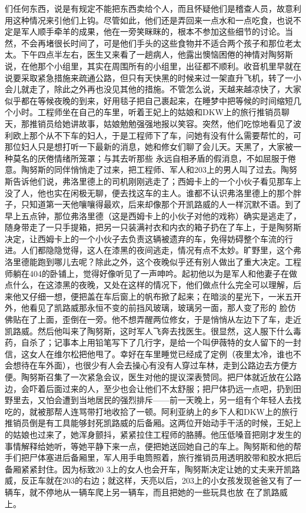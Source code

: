 \documentclass{article}
\begin{document}
们任何东西，说是有规定不能把东西卖给个人，而且怀疑他们是稽查人员，故意利用这种情况来引他们上钩。尽管如此，他们还是弄回来一点水和一点吃食，也说不定是军人顺手牵羊的成果，他在一旁笑眯眯的，根本不参加这些细节的讨论。当然，不会再堵很长时间了，可是他们手头的这些食物并不适合两个孩子和那位老太太。下午四点半左右，医生又来看了一趟病人，他露出懊恼困倦的神情对陶努斯说，在他那个小组里，其实在周围所有的小组里，出征都不顺利。收音机里早就在说要采取紧急措施来疏通公路，但只有天快黑的时候来过一架直升飞机，转了一小会儿就走了，除此之外再也没见其他的措施。不管怎么说，天越来越凉快了，大家似乎都在等候夜晚的到来，好用毯子把自己裹起来，在睡梦中把等候的时间缩短几个小时。工程师坐在自己的车里，听着王妃上的姑娘和DKW上的旅行推销员聊天，那推销员给她讲故事，姑娘勉勉强强地报以笑容。突然，他们吃惊地看见了波利欧上那个从不下车的妇人，于是工程师下了车，问她有没有什么需要帮忙的，可那位妇人只是想打听一下最新的消息，她和修女们聊了会儿天。天黑了，大家被一种莫名的厌倦情绪所笼罩；与其去听那些
\newpage
永远自相矛盾的假消息，不如屈服于倦意。陶努斯的同伴悄悄走了过来，把工程师、军人和203上的男人叫了过去。陶努斯告诉他们说，弗洛里德上的司机刚刚逃走了；西姆卡上的一个小伙子看见那车上没了人，他也实在闲极无聊，便去找这车的主人。谁都不认识弗洛里德上的那个胖子，只知道第一天他嚷嚷得最欢，后来却像那个开凯路威的人一样沉默不语。到了早上五点钟，那位弗洛里德（这是西姆卡上的小伙子对他的戏称）确实是逃走了，随身带走了一只手提箱，把另一只装满衬衣和内衣的箱子扔在了车上，于是陶努斯决定，让西姆卡上的一个小伙子去负责这辆被遗弃的车，免得妨碍整个车流的行进。人们都隐隐觉得，这人在漆黑的夜间逃走，情况有点不太妙。旷野里，这个弗洛里德能跑到哪儿去呢？除此之外，这个夜晚似乎还有别人做出了重大决定。工程师躺在404的卧铺上，觉得好像听见了一声呻吟。起初他以为是军人和他妻子在做点什么，在这漆黑的夜晚，又处在这样的情况下，他们做点什么完全可以理解，后来他又仔细一想，便把盖在车后窗上的帆布掀了起来；在暗淡的星光下，一米五开外，他看见了凯路威那永恒不变的前挡风玻璃，玻璃另一面，那人变了形的
\newpage
脸仿佛贴在了上面，歪倒在一旁。他不想弄醒两位修女，于是悄悄从左边下了车，走近凯路威。然后他叫来了陶努斯，这时军人飞奔去找医生。很显然，这人服下什么毒药，自杀了；记事本上用铅笔写下了几行字，是给一个叫伊薇特的女人留下的一封信，这女人在维尔松把他甩了。幸好在车里睡觉已经成了定例（夜里太冷，谁也不会想待在车外面），也很少有人会去操心有没有人穿过车林，走到公路边去方便方便。陶努斯召集了一次紧急会议，医生对他的提议深表赞同。把尸体就近放在公路边，会吓着后面过来的人，至少也会让他们不太舒服；把尸体扔远一点吧，扔到田野里去，又怕会遭到当地居民的强烈排斥——前一天晚上，另一组有个年轻人去找吃的，就被那帮人连骂带打地收拾了一顿。阿利亚纳上的乡下人和DKW上的旅行推销员倒是有工具能够封死凯路威的后备厢。这两位开始动手干活的时候，王妃上的姑娘也过来了，她浑身颤抖，紧紧拉住工程师的胳膊。他压低嗓音把刚才发生的事情解释给她听，等她平静下来一点，便把她送回她自己的车上。陶努斯和他的帮手们把尸体塞进后备厢里，军人用手电筒照着，旅行推销员用透明胶带和胶水把后备厢紧紧封住。因为标致20
\newpage
3上的女人也会开车，陶努斯决定让她的丈夫来开凯路威，反正车就在203的右边；就这样，天亮以后，203上的小女孩发现爸爸又有了一辆车，就不停地从一辆车爬上另一辆车，而且把她的一些玩具也放
在了凯路威上。 
\end{document}
